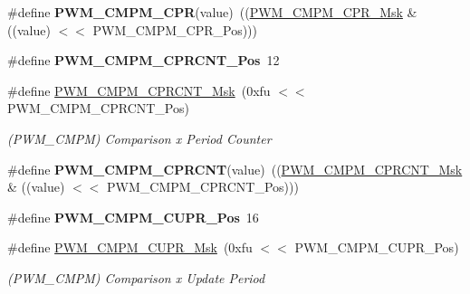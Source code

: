 \begin{DoxyCompactItemize}
\mbox{\label{group__SAME70__PWM_ga42d54748d1536414c80dac1643bebbf1}} 
\#define {\bfseries P\+W\+M\+\_\+\+C\+M\+P\+M\+\_\+\+C\+PR}(value)~((\mbox{\hyperlink{group__SAMV71__PWM_ga7951fd10abe22d74f4c2c6e9802a3f2d}{P\+W\+M\+\_\+\+C\+M\+P\+M\+\_\+\+C\+P\+R\+\_\+\+Msk}} \& ((value) $<$$<$ P\+W\+M\+\_\+\+C\+M\+P\+M\+\_\+\+C\+P\+R\+\_\+\+Pos)))
\item 
\mbox{\label{group__SAME70__PWM_ga836c4e58d85e35a123223da621292f63}} 
\#define {\bfseries P\+W\+M\+\_\+\+C\+M\+P\+M\+\_\+\+C\+P\+R\+C\+N\+T\+\_\+\+Pos}~12
\item 
\mbox{\label{group__SAME70__PWM_ga2945c884ad4aab06150ae99c19542202}} 
\#define \mbox{\hyperlink{group__SAME70__PWM_ga2945c884ad4aab06150ae99c19542202}{P\+W\+M\+\_\+\+C\+M\+P\+M\+\_\+\+C\+P\+R\+C\+N\+T\+\_\+\+Msk}}~(0xfu $<$$<$ P\+W\+M\+\_\+\+C\+M\+P\+M\+\_\+\+C\+P\+R\+C\+N\+T\+\_\+\+Pos)
\begin{DoxyCompactList}\small\item\em (P\+W\+M\+\_\+\+C\+M\+PM) Comparison x Period Counter \end{DoxyCompactList}\item 
\mbox{\label{group__SAME70__PWM_gac3be5e55b87abd7e1687d9be77595a26}} 
\#define {\bfseries P\+W\+M\+\_\+\+C\+M\+P\+M\+\_\+\+C\+P\+R\+C\+NT}(value)~((\mbox{\hyperlink{group__SAMV71__PWM_ga2945c884ad4aab06150ae99c19542202}{P\+W\+M\+\_\+\+C\+M\+P\+M\+\_\+\+C\+P\+R\+C\+N\+T\+\_\+\+Msk}} \& ((value) $<$$<$ P\+W\+M\+\_\+\+C\+M\+P\+M\+\_\+\+C\+P\+R\+C\+N\+T\+\_\+\+Pos)))
\item 
\mbox{\label{group__SAME70__PWM_ga487940e89e6d4b4a554a13b88e876c83}} 
\#define {\bfseries P\+W\+M\+\_\+\+C\+M\+P\+M\+\_\+\+C\+U\+P\+R\+\_\+\+Pos}~16
\item 
\mbox{\label{group__SAME70__PWM_gaadd54a225ed379648b3693dfbcc56a15}} 
\#define \mbox{\hyperlink{group__SAME70__PWM_gaadd54a225ed379648b3693dfbcc56a15}{P\+W\+M\+\_\+\+C\+M\+P\+M\+\_\+\+C\+U\+P\+R\+\_\+\+Msk}}~(0xfu $<$$<$ P\+W\+M\+\_\+\+C\+M\+P\+M\+\_\+\+C\+U\+P\+R\+\_\+\+Pos)
\begin{DoxyCompactList}\small\item\em (P\+W\+M\+\_\+\+C\+M\+PM) Comparison x Update Period \end{DoxyCompactList}\item 

\end{DoxyCompactItemize}
